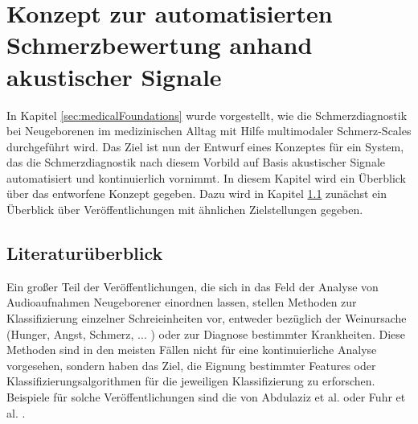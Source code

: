 \chapter{Konzept zur automatisierten Schmerzbewertung anhand akustischer Signale}
\label{sec:concept}

In Kapitel \ref{sec:medicalFoundations} wurde vorgestellt, wie die Schmerzdiagnostik bei Neugeborenen im medizinischen Alltag mit Hilfe multimodaler Schmerz-Scales durchgeführt wird. Das Ziel ist nun der Entwurf eines Konzeptes für ein System, das die Schmerzdiagnostik nach diesem Vorbild auf Basis akustischer Signale automatisiert und kontinuierlich vornimmt. In diesem Kapitel wird ein Überblick über das entworfene Konzept gegeben. Dazu wird in Kapitel \ref{sec:system_literature} zunächst ein Überblick über Veröffentlichungen mit ähnlichen Zielstellungen gegeben.

\section{Literaturüberblick}
\label{sec:system_literature}

Ein großer Teil der Veröffentlichungen, die sich in das Feld der Analyse von Audioaufnahmen Neugeborener einordnen lassen, stellen Methoden zur Klassifizierung einzelner Schreieinheiten vor, entweder bezüglich der Weinursache (Hunger, Angst, Schmerz, ... ) oder zur Diagnose bestimmter Krankheiten. Diese Methoden sind in den meisten Fällen nicht für eine kontinuierliche Analyse vorgesehen, sondern haben das Ziel, die Eignung bestimmter Features oder Klassifizierungsalgorithmen für die jeweiligen Klassifizierung zu erforschen. Beispiele für solche Veröffentlichungen sind die von Abdulaziz et al. \cite{class_abdulaziz} oder Fuhr et al. \cite{comparisonOfLearning}.

